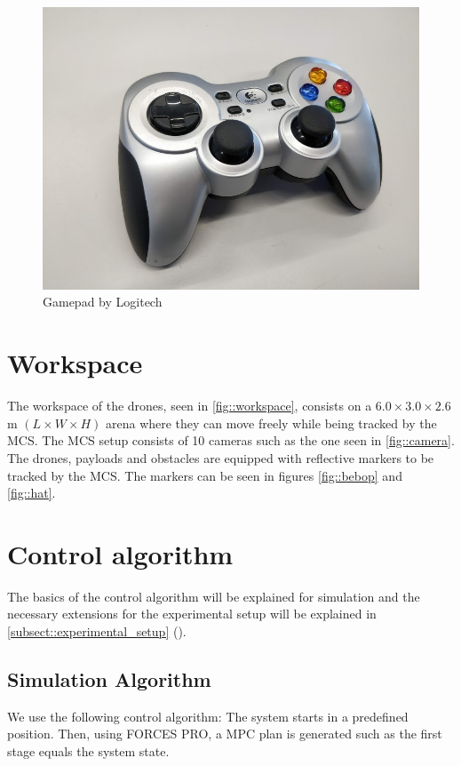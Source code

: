 \begin{figure}
\begin{minipage}{.31\textwidth}
		\includegraphics[width=.95\linewidth]{Figures/gamepad}
		\caption{Gamepad by Logitech}
		\label{fig::gamepad}
	\end{minipage}
\end{figure}

\section{Workspace}
The workspace of the drones, seen in  \cref{fig::workspace}, consists on a $6.0\times3.0\times2.6$ \si{\meter} $(L\times W\times H)$ arena where they can move freely while being tracked by the \ac{MCS}. The \ac{MCS} setup consists of 10 cameras such as the one seen in \cref{fig::camera}. The drones, payloads and obstacles are equipped with reflective markers to be tracked by the \ac{MCS}. The markers can be seen in figures \ref{fig::bebop} and \ref{fig::hat}.

\section{Control algorithm}
\label{sect::algorithm}
The basics of the control algorithm will be explained for simulation and the necessary extensions for the experimental setup will be explained in \cref{subsect::experimental_setup} ().

\subsection{Simulation Algorithm}
We use the following control algorithm: The system starts in a predefined position. Then, using FORCES PRO, a \ac{MPC} plan is generated such as the first stage equals the system state. 

